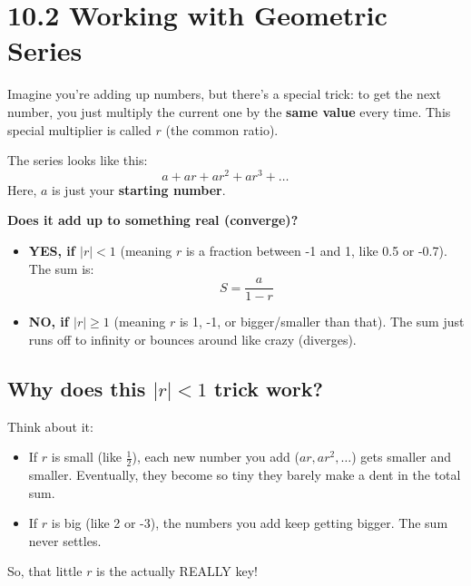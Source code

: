 \documentclass{article}
\begin{document}
\newpage

\section{10.2 Working with Geometric Series}

\begin{tcolorbox}[colback=gray!10!white,colframe=gray!75!black,title=What's a Geometric Series Anyway?]
Imagine you're adding up numbers, but there's a special trick: to get the next number, you just multiply the current one by the \textbf{same value} every time. This special multiplier is called \(r\) (the common ratio).

The series looks like this:
\[
a + ar + ar^2 + ar^3 + \dots \quad \text{  }
\]
Here, \(a\) is just your \textbf{starting number}.

\textbf{Does it add up to something real (converge)?}
\begin{itemize}
    \item \textbf{YES, if \(|r| < 1\)} (meaning \(r\) is a fraction between -1 and 1, like 0.5 or -0.7).
    The sum is: \[ \boxed{S = \frac{a}{1-r}} \]
    \item \textbf{NO, if \(|r| \ge 1\)} (meaning \(r\) is 1, -1, or bigger/smaller than that). The sum just runs off to infinity or bounces around like crazy (diverges).
\end{itemize}

\end{tcolorbox}

\subsection*{Why does this \(|r|<1\) trick work?}
Think about it:
\begin{itemize}
    \item If \(r\) is small (like \(\frac{1}{2}\)), each new number you add (\(ar, ar^2, \dots\)) gets smaller and smaller. Eventually, they become so tiny they barely make a dent in the total sum.
    \item If \(r\) is big (like 2 or -3), the numbers you add keep getting bigger. The sum never settles.
\end{itemize}
So, that little \(r\) is the actually REALLY key!
\end{document}
